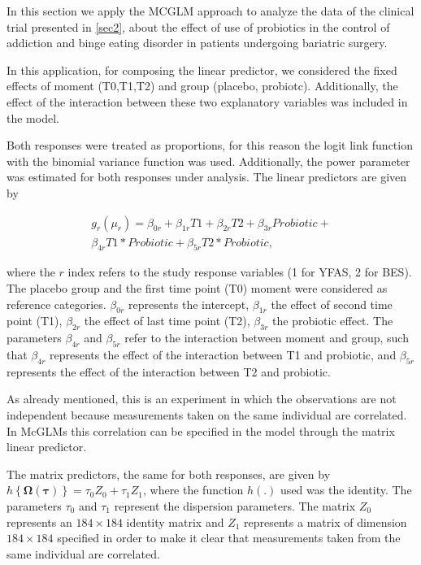 \documentclass[Review,sagev,times, doublespace]{sagej}
\begin{document}

In this section we apply the MCGLM approach to analyze the data of the clinical trial presented in \autoref{sec2}, about the effect of use of probiotics in the control of addiction and binge eating disorder in patients undergoing bariatric surgery.

In this application, for composing the linear predictor, we considered the fixed effects of moment (T0,T1,T2) and group (placebo, probiotc). Additionally, the effect of the interaction between these two explanatory variables was included in the model. 

Both responses were treated as proportions, for this reason the logit link function with the binomial variance function was used. Additionally, the power parameter was estimated for both responses under analysis. The linear predictors are given by

\begin{equation*}
  \begin{array}{r}
    g_{r}(\mu_{r}) = \beta_{0r} + \beta_{1r} T1 + \beta_{2r} T2 + \beta_{3r} Probiotic + \\ \beta_{4r} T1*Probiotic + \beta_{5r} T2*Probiotic,
  \end{array}
\end{equation*}

\noindent where the $r$ index refers to the study response variables (1 for YFAS, 2 for BES). The placebo group and the first time point (T0) moment were considered as reference categories. $\beta_{0r}$ represents the intercept, $\beta_{1r}$ the effect of second time point (T1), $\beta_{2r}$ the effect of last time point (T2), $\beta_{3r}$ the probiotic effect. The parameters $\beta_{4r}$ and $\beta_{5r}$ refer to the interaction between moment and group, such that $\beta_{4r}$ represents the effect of the interaction between T1 and probiotic, and $ \beta_{5r}$ represents the effect of the interaction between T2 and probiotic.

As already mentioned, this is an experiment in which the observations are not independent because measurements taken on the same individual are correlated. In McGLMs this correlation can be specified in the model through the matrix linear predictor.

The matrix predictors, the same for both responses, are given by $h\left \{ \boldsymbol{\Omega}(\boldsymbol{\tau}) \right \} = \tau_0Z_0 + \tau_1Z_1$, where the function $h(.)$ used was the identity. The parameters $\tau_0$ and $\tau_1$ represent the dispersion parameters. The matrix $Z_0$ represents an $184 \times 184$ identity matrix and $Z_1$ represents a matrix of dimension $184 \times 184$ specified in order to make it clear that measurements taken from the same individual are correlated. 
\end{document}
